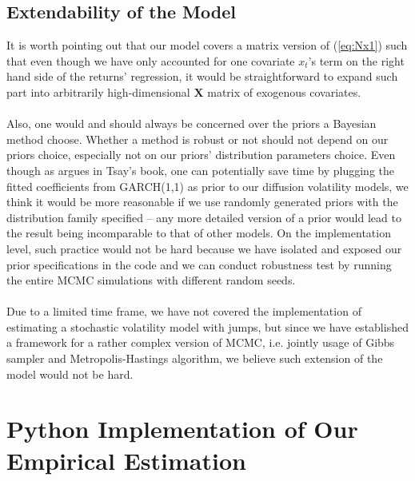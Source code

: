 \documentclass[letterpaper]{article}
\begin{document}
	\subsection{Extendability of the Model}
	It is worth pointing out that our model covers a matrix version of (\ref{eq:Nx1}) such that even though we have only accounted for one covariate $x_t$'s term on the right hand side of the returns' regression, it would be straightforward to expand such part into arbitrarily high-dimensional $\mathbf{X}$ matrix of exogenous covariates.\\\\
	Also, one would and should always be concerned over the priors a Bayesian method choose. Whether a method is robust or not should not depend on our priors choice, especially not on our priors' distribution parameters choice. Even though as argues in Tsay's book, one can potentially save time by plugging the fitted coefficients from GARCH(1,1) as prior to our diffusion volatility models, we think it would be more reasonable if we use randomly generated priors with the distribution family specified --  any more detailed version of a prior would lead to the result being incomparable to that of other models. On the implementation level, such practice would not be hard because we have isolated and exposed our prior specifications in the code and we can conduct robustness test by running the entire MCMC simulations with different random seeds.\\\\
	Due to a limited time frame, we have not covered the implementation of estimating a stochastic volatility model with jumps, but since we have established a framework for a rather complex version of MCMC, i.e. jointly usage of Gibbs sampler and Metropolis-Hastings algorithm, we believe such extension of the model would not be hard.
	\newpage
	\appendix
	\section{Python Implementation of Our Empirical Estimation}
	\newcommand{\PythonStyle}{
		\lstset{
			language=Python,
			basicstyle=\ttfamily\small,
			keywordstyle=\color{jpurple}\bfseries,
			stringstyle=\color{red},
			commentstyle=\color{verde},
			morecomment=[s][\color{blue}]{/**}{*/},
			extendedchars=true,
			showspaces=false,
			showstringspaces=false,
			numbers=left,
			numberstyle=\tiny,
			breaklines=true,
			backgroundcolor=\color{cyan!10},
			breakautoindent=true,
			captionpos=b,
			xleftmargin=0pt,
			tabsize=2
	}}
	
\end{document}
